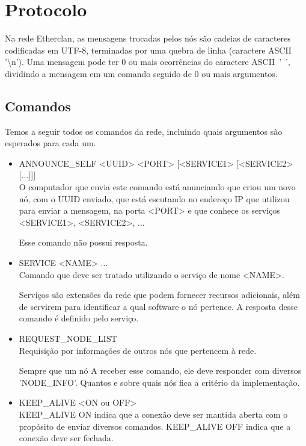 \section{Protocolo}
\label{sec:etherclan:protocolo}
  Na rede Etherclan, as mensagens trocadas pelos nós são cadeias de caracteres codificadas em UTF-8,
  terminadas por uma quebra de linha (caractere ASCII '\textbackslash n'). Uma mensagem pode ter 0
  ou mais ocorrências do caractere  ASCII~'~', dividindo a mensagem em um comando seguido de 0 ou
  mais argumentos.

  \subsection{Comandos}
  \label{sec:etherclan:protocolo:comandos}
    Temos a seguir todos os comandos da rede, incluindo quais argumentos são esperados
    para cada um.
      
    \begin{itemize}
      \item ANNOUNCE\_SELF <UUID> <PORT> [<SERVICE1> [<SERVICE2> [...]]] \\
        O computador que envia este comando está anunciando que criou um novo nó, com o UUID enviado,
        que está escutando no endereço IP que utilizou para enviar a mensagem, na porta <PORT> e que
        conhece os serviços <SERVICE1>, <SERVICE2>, ...
        
        Esse comando não possui resposta.
    
      \item SERVICE <NAME> ... \\
        Comando que deve ser tratado utilizando o serviço de nome <NAME>.
        
        Serviços são extensões da rede que podem fornecer recursos adicionais, além de servirem
        para identificar a qual software o nó pertence.
        A resposta desse comando é definido pelo serviço.
    
      \item REQUEST\_NODE\_LIST \\
        Requisição por informações de outros nós que pertencem à rede.
        
        Sempre que um nó A receber esse comando, ele deve responder com diversos 'NODE\_INFO'.
        Quantos e sobre quais nós fica a critério da implementação.
        
      \item KEEP\_ALIVE <ON ou OFF> \\
        KEEP\_ALIVE ON indica que a conexão deve ser mantida aberta com o propósito de enviar
        diversos comandos.
        KEEP\_ALIVE OFF indica que a conexão deve ser fechada.
        
    \end{itemize}
  
